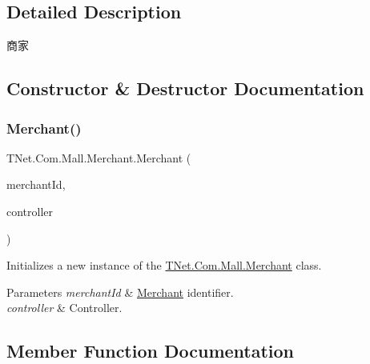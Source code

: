 \subsection{Detailed Description}
商家 



\subsection{Constructor \& Destructor Documentation}
\mbox{\label{class_t_net_1_1_com_1_1_mall_1_1_merchant_a9895dbbfb76c8d7815377c001e4925ab}} 
\subsubsection{\texorpdfstring{Merchant()}{Merchant()}}
{\footnotesize\ttfamily T\+Net.\+Com.\+Mall.\+Merchant.\+Merchant (\begin{DoxyParamCaption}\item[{int}]{merchant\+Id,  }\item[{\mbox{\hyperlink{class_t_net_1_1_com_1_1_mall_1_1_mall_controller}{Mall\+Controller}}}]{controller }\end{DoxyParamCaption})}



Initializes a new instance of the \mbox{\hyperlink{class_t_net_1_1_com_1_1_mall_1_1_merchant}{T\+Net.\+Com.\+Mall.\+Merchant}} class. 


\begin{DoxyParams}{Parameters}
{\em merchant\+Id} & \mbox{\hyperlink{class_t_net_1_1_com_1_1_mall_1_1_merchant}{Merchant}} identifier.\\
\hline
{\em controller} & Controller.\\
\hline
\end{DoxyParams}


\subsection{Member Function Documentation}
\mbox{\label{class_t_net_1_1_com_1_1_mall_1_1_merchant_af787957e959d176b192dfef20f681bad}} 
